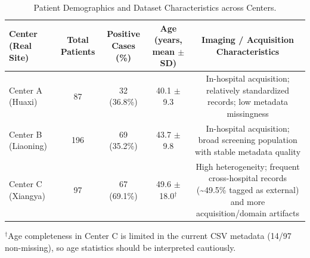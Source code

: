 \begin{table}[t]
\centering
\caption{Patient Demographics and Dataset Characteristics across Centers.}
\label{tab:patient_demographics}
\setlength{\tabcolsep}{6pt}
\begin{tabular}{lcccc}
\hline
Center (Real Site) & Total Patients & Positive Cases (\%) & Age (years, mean $\pm$ SD) & Imaging / Acquisition Characteristics \\
\hline
Center A (Huaxi) & 87 & 32 (36.8\%) & 40.1 $\pm$ 9.3 & In-hospital acquisition; relatively standardized records; low metadata missingness \\
Center B (Liaoning) & 196 & 69 (35.2\%) & 43.7 $\pm$ 9.8 & In-hospital acquisition; broad screening population with stable metadata quality \\
Center C (Xiangya) & 97 & 67 (69.1\%) & 49.6 $\pm$ 18.0$^\dagger$ & High heterogeneity; frequent cross-hospital records (\textasciitilde49.5\% tagged as external) and more acquisition/domain artifacts \\
\hline
\end{tabular}
\vspace{2mm}

\footnotesize{$^\dagger$Age completeness in Center C is limited in the current CSV metadata (14/97 non-missing), so age statistics should be interpreted cautiously.}
\end{table}
